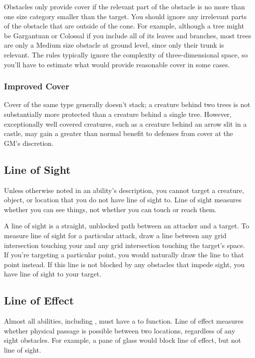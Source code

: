             Obstacles only provide cover if the relevant part of the obstacle is no more than one size category smaller than the target.
            You should ignore any irrelevant parts of the obstacle that are outside of the cone.
            For example, although a tree might be Gargantuan or Colossal if you include all of its leaves and branches, most trees are only a Medium size obstacle at ground level, since only their trunk is relevant.
            The rules typically ignore the complexity of three-dimensional space, so you'll have to estimate what would provide reasonable cover in some cases.

            \subsubsection{Improved Cover}
            Cover of the same type generally doesn't stack; a creature behind two trees is not substantially more protected than a creature behind a single tree.
            However, exceptionally well covered creatures, such as a creature behind an arrow slit in a castle, may gain a greater than normal benefit to defenses from cover at the GM's discretion.

    \subsection{Line of Sight}\label{Line of Sight}
        Unless otherwise noted in an ability's description, you cannot target a creature, object, or location that you do not have line of sight to.
        Line of sight measures whether you can see things, not whether you can touch or reach them.

        A line of sight is a straight, unblocked path between an attacker and a target.
        To measure line of sight for a particular attack, draw a line between any grid intersection touching your  and any grid intersection touching the target's space.
        If you're targeting a particular point, you would naturally draw the line to that point instead.
        If this line is not blocked by any obstacles that impede sight, you have line of sight to your target.

    \subsection{Line of Effect}\label{Line of Effect}
        Almost all abilities, including , must have a  to function.
        Line of effect measures whether physical passage is possible between two locations, regardless of any sight obstacles.
        For example, a pane of glass would block line of effect, but not line of sight.

